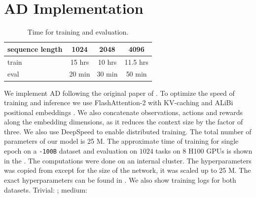 \documentclass{article}
\begin{document}
\section{AD Implementation}
\label{apndx:ad}
\begin{table}[h!]
\caption{Time for training and evaluation.}
\centering
\label{tab:ad-time}
\begin{tabular}{@{}lccc@{}}
\toprule
sequence length & 1024 & 2048 & 4096 \\ \midrule
train & 15 hrs & 10 hrs & 11.5 hrs \\
eval & 20 min & 30 min & 50 min \\ \bottomrule
\end{tabular}
\end{table}
We implement AD following the original paper of \citet{laskin2022context}. To optimize the speed of training and inference we use FlashAttention-2 \citep{dao2023flashattention2} with KV-caching and ALiBi positional embeddings \citep{press2022train}. We also concatenate observations, actions and rewards along the embedding dimensions, as it reduces the context size by the factor of three. We also use DeepSpeed \citep{rasley2020deepspeed} to enable distributed training. The total number of parameters of our model is 25 M.
The approximate time of training for single epoch on a \texttt{-100B} dataset and evaluation on $1024$ tasks on 8 H100 GPUs is shown in the . The computations were done on an internal cluster.
The hyperparameters was copied from \citep{laskin2022context} except for the size of the network, it was scaled up to 25 M. The exact hyperparameters can be found in .
We also show training logs for both datasets. Trivial: \href{https://wandb.ai/dunnolab/xminigrid-datasets?nw=96pyqrtxwuu}{\color{blue}{wandb}}; medium: \href{https://wandb.ai/dunnolab/xminigrid-datasets?nw=5u8wa1myqlw}{\color{blue}{wandb}}
\end{document}
